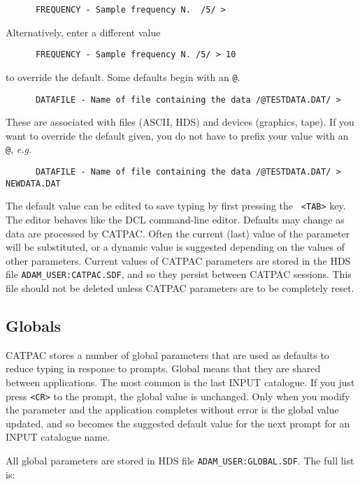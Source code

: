 \begin{verbatim}
      FREQUENCY - Sample frequency N.  /5/ >
\end{verbatim}
Alternatively, enter a different value
\begin{verbatim}
      FREQUENCY - Sample frequency N. /5/ > 10
\end{verbatim}
to override the default. 
Some defaults begin with an {\tt @}.
\begin{verbatim}
      DATAFILE - Name of file containing the data /@TESTDATA.DAT/ > 
\end{verbatim}

These are associated with files (ASCII, HDS) and devices (graphics,
tape). If you want to override the default given, you do not have to
prefix your value with an {\tt @}, {\it e.g.}

\begin{verbatim}
      DATAFILE - Name of file containing the data /@TESTDATA.DAT/ > NEWDATA.DAT
\end{verbatim}

The default value can be edited to save typing by first pressing the {\tt
<TAB>} key. The editor behaves like the {\small DCL} command-line editor.
Defaults may change as data are processed by {\small CATPAC}. Often the current
(last) value of the parameter will be substituted, or a dynamic value is
suggested depending on the values of other parameters.  Current values of
CATPAC parameters are stored in the HDS file {\tt ADAM\_USER:CATPAC.SDF}, and
so they persist between {\small CATPAC} sessions. This file should not be
deleted unless {\small CATPAC} parameters are to be completely reset. 

\subsection{Globals}

{\small CATPAC} stores a number of global parameters that are used as defaults
to reduce typing in response to prompts. Global means that they are shared
between applications.  The most common is the last INPUT catalogue. If you just
press {\tt <CR>} to the prompt, the global value is unchanged. Only when you
modify the parameter and the  application completes without error is the global
value updated, and so becomes the suggested default value for the next prompt
for an INPUT catalogue name.

All global parameters are stored in HDS file {\tt ADAM\_USER:GLOBAL.SDF}.
The full list is:

